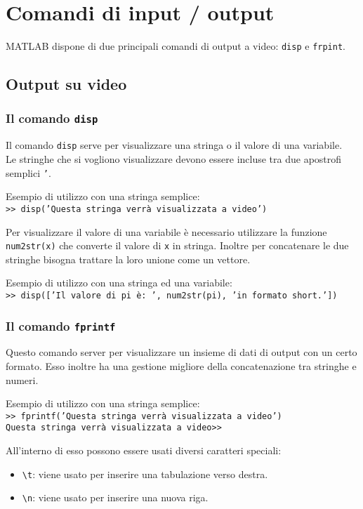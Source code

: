 \chapter{Comandi di input / output}
MATLAB dispone di due principali comandi di output a video: \texttt{disp} e \texttt{frpint}.
\section{Output su video}
\subsection{Il comando \texttt{disp}}
Il comando \texttt{disp} serve per visualizzare una stringa o il valore di una variabile. \\
Le stringhe che si vogliono visualizzare devono essere incluse tra due apostrofi semplici \texttt{'}.
\break
			
Esempio di utilizzo con una stringa semplice: \\
\texttt{>> disp('Questa stringa verrà visualizzata a video')} 
\break
			
Per visualizzare il valore di una variabile è necessario utilizzare la funzione \texttt{num2str(x)} che converte il 
valore di \texttt{x} in stringa. Inoltre per concatenare le due stringhe bisogna trattare la loro unione come un 
vettore. 
\break
			
Esempio di utilizzo con una stringa ed una variabile: \\
\texttt{>> disp(['Il valore di pi è: ', num2str(pi), 'in formato short.'])}

\subsection{Il comando \texttt{fprintf}}
Questo comando server per visualizzare un insieme di dati di output con un certo formato. Esso inoltre ha una gestione 
migliore della concatenazione tra stringhe e numeri.
\break
			
Esempio di utilizzo con una stringa semplice: \\
\texttt{>> fprintf('Questa stringa verrà visualizzata a video')} \\
\texttt{Questa stringa verrà visualizzata a video>>}
\break
			
All'interno di esso possono essere usati diversi caratteri speciali:
\begin{itemize}
	\item	\texttt{\textbackslash t}: viene usato per inserire una tabulazione verso destra.
	\item	\texttt{\textbackslash n}: viene usato per inserire una nuova riga.
\end{itemize}

